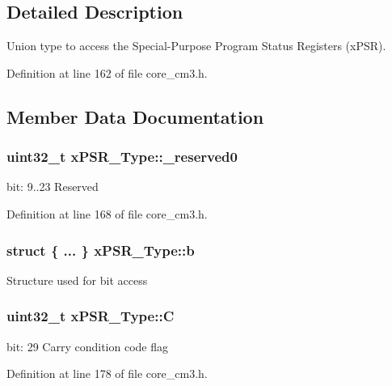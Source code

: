\subsection{\-Detailed \-Description}
\-Union type to access the \-Special-\/\-Purpose \-Program \-Status \-Registers (x\-P\-S\-R). 

\-Definition at line 162 of file core\-\_\-cm3.\-h.



\subsection{\-Member \-Data \-Documentation}
\hypertarget{unionx_p_s_r___type_af438e0f407357e914a70b5bd4d6a97c5}{
\subsubsection[{\-\_\-reserved0}]{\setlength{\rightskip}{0pt plus 5cm}uint32\-\_\-t {\bf x\-P\-S\-R\-\_\-\-Type\-::\-\_\-reserved0}}}\label{unionx_p_s_r___type_af438e0f407357e914a70b5bd4d6a97c5}
bit\-: 9..23 \-Reserved 

\-Definition at line 168 of file core\-\_\-cm3.\-h.

\hypertarget{unionx_p_s_r___type_a3b1063bb5cdad67e037cba993b693b70}{
\subsubsection[{b}]{\setlength{\rightskip}{0pt plus 5cm}struct \{ ... \}   {\bf x\-P\-S\-R\-\_\-\-Type\-::b}}}\label{unionx_p_s_r___type_a3b1063bb5cdad67e037cba993b693b70}
\-Structure used for bit access \hypertarget{unionx_p_s_r___type_a40213a6b5620410cac83b0d89564609d}{
\subsubsection[{\-C}]{\setlength{\rightskip}{0pt plus 5cm}uint32\-\_\-t {\bf x\-P\-S\-R\-\_\-\-Type\-::\-C}}}\label{unionx_p_s_r___type_a40213a6b5620410cac83b0d89564609d}
bit\-: 29 \-Carry condition code flag 

\-Definition at line 178 of file core\-\_\-cm3.\-h.

